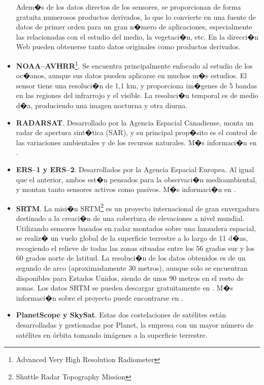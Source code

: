 \begin{itemize}
	Adem�s de los datos directos de los sensores, se proporcionan de forma gratuita numerosos productos derivados, lo que lo convierte en una fuente de datos de primer orden para un gran n�mero de aplicaciones, especialmente las relacionadas con el estudio del medio, la vegetaci�n, etc. En la direcci�n Web \cite{webModisData} pueden obtenerse tanto datos originales como productos derivados.
	\item \textbf{NOAA--AVHRR}\footnote{Advanced Very High Resolution Radiometer}. Se encuentra principalmente enfocado al estudio de los oc�anos, aunque sus datos pueden aplicarse en muchos m�s estudios. El sensor tiene una resoluci�n de 1,1 km, y proporciona im�genes de 5 bandas en las regiones del infrarrojo y el visible. La resoluci�n temporal es de medio d�a, produciendo una imagen nocturna y otra diurna.
	\item \textbf{RADARSAT}. Desarrollado por la Agencia Espacial Canadiense, monta un radar de apertura sint�tica (SAR), y su principal prop�sito es el control de las variaciones ambientales y de los recursos naturales. M�s informaci�n en \cite{webRADARSAT}.
	\item \textbf{ERS--1 y ERS--2}. Desarrollados por la Agencia Espacial Europea. Al igual que el anterior, ambos est�n pensados para la observaci�n medioambiental, y montan tanto sensores activos como pasivos. M�s informaci�n en \cite{webERS2}.
	\item \textbf{SRTM}. La misi�n SRTM\footnote{Shuttle Radar Topography Mission} es un proyecto internacional de gran envergadura destinado a la creaci�n de una cobertura de elevaciones a nivel mundial. Utilizando sensores basados en radar montados sobre una lanzadera espacial, se realiz� un vuelo global de la superficie terrestre a lo largo de 11 d�as, recogiendo el relieve de todas las zonas situadas entre los 56 grados sur y los 60 grados norte de latitud. La resoluci�n de los datos obtenidos es de un segundo de arco (aproximadamente 30 metros), aunque solo se encuentran disponibles para Estados Unidos, siendo de unos 90 metros en el resto de zonas. Los datos SRTM se pueden descargar gratuitamente en \cite{webSRTMDownload}. M�s informaci�n sobre el proyecto puede encontrarse en \cite{webSRTM}. 
	\item \textbf{PlanetScope y SkySat}. Estas dos costelaciones de satélites están desarrolladas y gestionadas por Planet, la empresa con un mayor número de satélites en órbita tomando imágenes a la superficie terrestre. 


\end{itemize}
